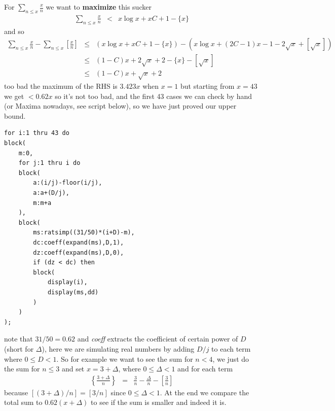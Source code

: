\documentclass[aps,preprint,preprintnumbers,nofootinbib,showpacs,prd]{revtex4-1}
\newcommand{\nbea}{\begin{eqnarray*}}
\newcommand{\neea}{\end{eqnarray*}}
\begin{document}
For $\sum_{n\le x}\frac{x}{n}$ we want to {\bf maximize} this sucker
%
\nbea
\sum_{n\le x}\frac{x}{n} & < & x\log x + xC + 1 - \{x\}
\neea
%
and so
%
\nbea
\sum_{n\le x}\frac{x}{n} - \sum_{n\le x} \left\lbrack\frac{x}{n}\right\rbrack & \le & (x\log x + xC + 1 - \{x\}) - (x\log x + (2C-1)x - 1 - 2\sqrt{x} + [\sqrt{x}]) \\
& \le & (1-C)x + 2\sqrt{x} + 2 - \{x\} - [\sqrt{x}] \\
& \le & (1-C)x + \sqrt{x} + 2
\neea
%
too bad the maximum of the RHS is $3.423x$ when $x=1$ but starting from $x=43$ we get $< 0.62x$ so it's not too bad, and the first 43 cases we can check by hand (or Maxima nowadays, see script below), so we have just proved our upper bound.
%
\begin{verbatim}
for i:1 thru 43 do
block(
    m:0,
    for j:1 thru i do
    block(
        a:(i/j)-floor(i/j),
        a:a+(D/j),
        m:m+a
    ),
    block(
        ms:ratsimp((31/50)*(i+D)-m),
        dc:coeff(expand(ms),D,1),
        dz:coeff(expand(ms),D,0),
        if (dz < dc) then
        block(
            display(i),
            display(ms,dd)
        )
    )
);
\end{verbatim}
%
note that $31/50 = 0.62$ and {\it coeff} extracts the  coefficient of certain power of $D$ (short for $\Delta$), here we are simulating real  numbers by adding $D/j$ to each term where $0\le D <1$. So for example we want to see the sum for $n<4$, we just do the sum for $n\le 3$ and set $x=3+\Delta$, where $0\le\Delta<1$ and for each term
%
\nbea
\left\{\frac{3+\Delta}{n}\right\} & = & \frac{3}{n} - \frac{\Delta}{n} - \left\lbrack\frac{3}{n}\right\rbrack
\neea
%
because $[(3+\Delta)/n] = [3/n]$ since $0\le\Delta<1$. At the end we compare the total sum to $0.62(x + \Delta)$ to see if the sum is smaller and indeed it is.
\end{document}
